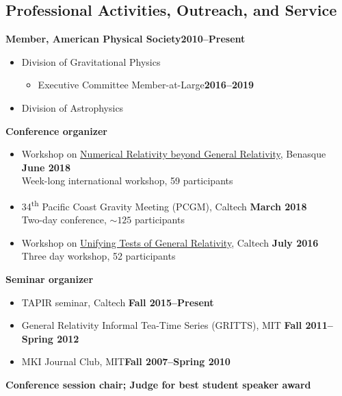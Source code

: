 \documentclass[margin,line]{res}
\begin{document}
\begin{resume}
\section{\sc Professional Activities, Outreach, and Service}
{\bf Member, American Physical Society}\hfill{\bf 2010--Present}\\
\begin{itemize}
\item[] Division of Gravitational Physics
  \begin{itemize}
  \item[] Executive Committee Member-at-Large\hfill{\bf 2016--2019}
  \end{itemize}
\item[] Division of Astrophysics
\end{itemize}
{\bf Conference organizer}
\vspace*{.05in}
\begin{itemize}
\item[] Workshop on
  \href{http://www.benasque.org/2018relativity/}{Numerical Relativity
    beyond General Relativity},
  Benasque \hfill {\bf June 2018} \\
\hspace*{1em} Week-long international workshop, 59 participants
\item[]
34\textsuperscript{th} Pacific Coast Gravity Meeting (PCGM),
Caltech
\hfill {\bf March 2018}\\
\hspace*{1em} Two-day conference, $\sim 125$ participants
\item[] Workshop on \href{http://www.tapir.caltech.edu/~unifying-gr-tests/}{Unifying Tests of General Relativity},
  Caltech \hfill {\bf July 2016} \\
\hspace*{1em} Three day workshop, 52 participants
\end{itemize}
{\bf Seminar organizer}
\vspace*{.05in}
\begin{itemize}
\item[] TAPIR seminar, Caltech\hfill
  {\bf Fall 2015--Present}
\item[] General Relativity Informal Tea-Time Series (GRITTS), MIT\hfill
  {\bf Fall 2011--Spring 2012}
\item[] MKI Journal Club, MIT\hfill {\bf Fall 2007--Spring 2010}
\end{itemize}
{\bf Conference session chair; Judge for best student speaker award}
\vspace*{.05in}

\end{resume}
\end{document}

